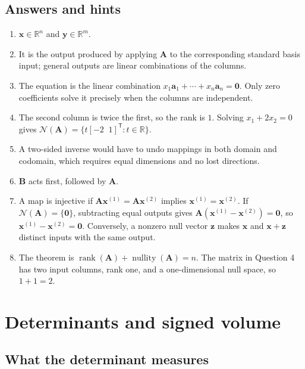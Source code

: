 \documentclass[
  australian,
  12pt,
  letterpaper,
  DIV=11,
  numbers=noendperiod,
  twoside]{scrreprt}
\providecommand{\tightlist}{%
  \setlength{\itemsep}{0pt}\setlength{\parskip}{0pt}}
\begin{document}
\subsection*{Answers and hints}\label{answers-and-hints-1}

\begin{enumerate}
\def\labelenumi{\arabic{enumi}.}
\tightlist
\item
  \(\mathbf x\in\mathbb R^n\) and \(\mathbf y\in\mathbb R^m\).
\item
  It is the output produced by applying \(\mathbf A\) to the
  corresponding standard basis input; general outputs are linear
  combinations of the columns.
\item
  The equation is the linear combination
  \(x_1\mathbf a_1+\cdots+x_n\mathbf a_n=\mathbf 0\). Only zero
  coefficients solve it precisely when the columns are independent.
\item
  The second column is twice the first, so the rank is \(1\). Solving
  \(x_1+2x_2=0\) gives
  \(\mathcal N(\mathbf A)=\{t[-2\;\;1]^\mathsf T:t\in\mathbb R\}\).
\item
  A two-sided inverse would have to undo mappings in both domain and
  codomain, which requires equal dimensions and no lost directions.
\item
  \(\mathbf B\) acts first, followed by \(\mathbf A\).
\item
  A map is injective if
  \(\mathbf A\mathbf x^{(1)}=\mathbf A\mathbf x^{(2)}\) implies
  \(\mathbf x^{(1)}=\mathbf x^{(2)}\). If
  \(\mathcal N(\mathbf A)=\{\mathbf0\}\), subtracting equal outputs
  gives \(\mathbf A(\mathbf x^{(1)}-\mathbf x^{(2)})=\mathbf0\), so
  \(\mathbf x^{(1)}-\mathbf x^{(2)}=\mathbf0\). Conversely, a nonzero
  null vector \(\mathbf z\) makes \(\mathbf x\) and
  \(\mathbf x+\mathbf z\) distinct inputs with the same output.
\item
  The theorem is
  \(\operatorname{rank}(\mathbf A)+\operatorname{nullity}(\mathbf A)=n\).
  The matrix in Question 4 has two input columns, rank one, and a
  one-dimensional null space, so \(1+1=2\).
\end{enumerate}

\section{Determinants and signed
volume}\label{determinants-and-signed-volume}

\subsection{What the determinant
measures}\label{what-the-determinant-measures}
\end{document}
